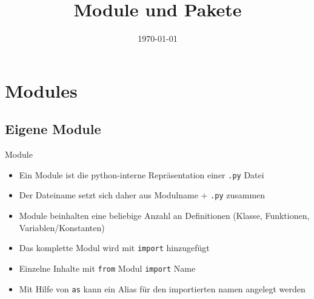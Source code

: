 

\usepackage{comment}

\newcommand{\topic}{
	Module und Pakete
}

\title{\topic}
\supertitle{\course}
\date{\today}



\maketitle

\begin{frame}
	\tableofcontents
\end{frame}


\section{Modules}
\subsection{Eigene Module}
\begin{frame}[fragile]{Module}
	\begin{itemize}
		\item Ein Module ist die python-interne Repräsentation einer \texttt{.py} Datei
		\item Der Dateiname setzt sich daher aus Modulname + \texttt{.py} zusammen
		\item Module beinhalten eine beliebige Anzahl an Definitionen (Klasse, Funktionen, Variablen/Konstanten)
		\item Das komplette Modul wird mit \texttt{import} hinzugefügt
		\item Einzelne Inhalte mit \texttt{from} Modul \texttt{import} Name
		\item Mit Hilfe von \texttt{as} kann ein Alias für den importierten namen angelegt werden
	\end{itemize}

\end{frame}

